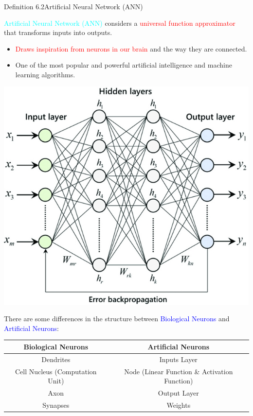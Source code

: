 \documentclass{book}
\begin{document}
\begin{defBox}{Definition 6.2}{Artificial Neural Network (ANN)}
    \raggedright
    \textcolor{cyan}{Artificial Neural Network (ANN)} considers a \textcolor{red}{universal function approximator} that transforms inputs into outputs.
    \begin{itemize}
    \item \textcolor{red}{Draws inspiration from neurons in our brain} and the way they are connected.
    \item One of the most popular and powerful artificial intelligence and machine learning algorithms.
    \end{itemize} 
    \begin{center}
        \includegraphics[scale=0.3]{chapter 6/ch6_figure3.jpeg}
    \end{center}
\end{defBox}
There are some differences in the structure between \textcolor{blue}{Biological Neurons} and \textcolor{blue}{Artificial Neurons}:
\begin{center}
    \begin{tabular}{|c|c|}
        \hline
        \rowcolor{lightblue}
        \textbf{Biological Neurons} & \textbf{Artificial Neurons}\\
        \hline
        Dendrites & Inputs Layer\\
        \hline
        Cell Nucleus (Computation Unit) & Node (Linear Function \& Activation Function)\\
        \hline
        Axon & Output Layer\\
        \hline
        Synapses & Weights\\
        \hline
    \end{tabular}
\end{center}
\end{document}
